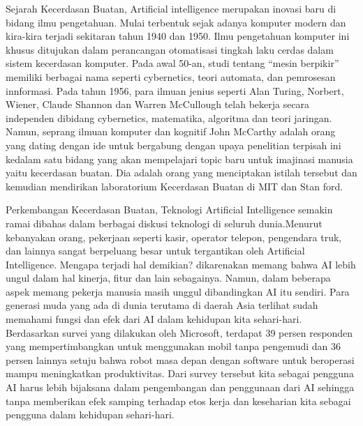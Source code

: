 \begin{enumerate}
	\hfill\break
	Sejarah Kecerdasan Buatan,  Artificial intelligence merupakan inovasi baru di bidang ilmu pengetahuan. Mulai terbentuk sejak adanya komputer modern dan kira-kira terjadi sekitaran tahun 1940 dan 1950. Ilmu pengetahuan komputer ini khusus ditujukan dalam perancangan otomatisasi tingkah laku cerdas dalam sistem kecerdasan komputer. Pada awal 50-an, studi tentang “mesin berpikir” memiliki berbagai nama seperti cybernetics, teori automata, dan pemrosesan innformasi. Pada tahun 1956, para ilmuan jenius seperti Alan Turing, Norbert, Wiener, Claude Shannon dan Warren McCullough telah bekerja secara independen dibidang cybernetics, matematika, algoritma dan teori jaringan. Namun, seprang ilmuan komputer dan kognitif John McCarthy adalah orang yang dating dengan ide untuk bergabung dengan upaya penelitian terpisah ini kedalam satu bidang yang akan mempelajari topic baru untuk imajinasi manusia yaitu kecerdasan buatan. Dia adalah orang yang menciptakan istilah tersebut dan kemudian mendirikan laboratorium Kecerdasan Buatan di MIT dan Stan ford.


    \hfill\break
    Perkembangan Kecerdasan Buatan, Teknologi Artificial Intelligence semakin ramai dibahas dalam berbagai diskusi teknologi di seluruh dunia.Menurut kebanyakan orang, pekerjaan seperti kasir, operator telepon, pengendara truk, dan lainnya sangat berpeluang besar untuk tergantikan oleh Artificial Intelligence. Mengapa terjadi hal demikian? dikarenakan memang bahwa AI lebih ungul dalam hal kinerja, fitur dan lain sebagainya. Namun, dalam beberapa aspek memang pekerja manusia masih unggul dibandingkan AI itu sendiri. Para generasi muda yang ada di dunia terutama di daerah Asia terlihat sudah memahami fungsi dan efek dari AI dalam kehidupan kita sehari-hari. Berdasarkan survei yang dilakukan oleh Microsoft, terdapat 39 persen responden yang mempertimbangkan untuk menggunakan mobil tanpa pengemudi dan 36 persen lainnya setuju bahwa robot masa depan dengan software untuk beroperasi mampu meningkatkan produktivitas. Dari survey tersebut kita sebagai pengguna AI harus lebih bijaksana dalam pengembangan dan penggunaan dari AI sehingga tanpa memberikan efek samping terhadap etos kerja dan keseharian kita sebagai pengguna dalam kehidupan sehari-hari.


\end{enumerate}
